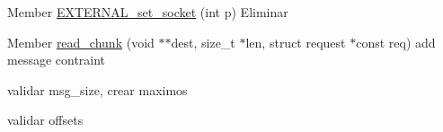 
\begin{DoxyRefList}
\item[Member \mbox{\hyperlink{group__LowSaurion_ga4a0bc8233ca030e29b9b94aed0177392}{EXTERNAL\+\_\+set\+\_\+socket}} (int p)]\label{todo__todo000001}%
%
Eliminar  
\item[Member \mbox{\hyperlink{group__LowSaurion_gaec24df6ee2f4999bf64acf5fc42ed019}{read\+\_\+chunk}} (void $\ast$$\ast$dest, size\+\_\+t $\ast$len, struct request $\ast$const req)]\label{todo__todo000002}%
%
add message contraint 



validar {\ttfamily msg\+\_\+size}, crear maximos 



validar {\ttfamily offsets} 
\end{DoxyRefList}